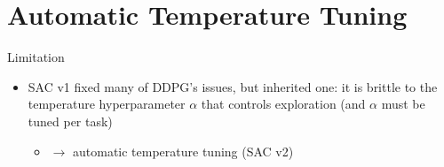 \section{Automatic Temperature Tuning}
\begin{frame}{Limitation}
\begin{itemize}
    \item SAC v1 fixed many of DDPG's issues, but inherited one: it is brittle to the temperature hyperparameter $\alpha$ that controls exploration (and $\alpha$ must be tuned per task)
    \begin{itemize}
        \item $\to$ automatic temperature tuning (SAC v2) 
    \end{itemize}
\end{itemize}
\end{frame}
